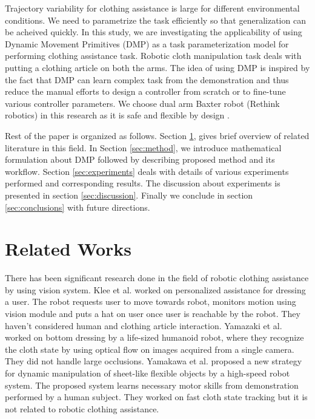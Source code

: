 \documentclass[sigconf]{acmart}
\begin{document}
Trajectory variability for clothing assistance is large for different environmental conditions. We need to parametrize the task efficiently so that generalization can be acheived quickly. In this study, we are investigating the applicability of using Dynamic Movement Primitives (DMP) as a task parameterization model for performing clothing assistance task. Robotic cloth manipulation task deals with putting a clothing article on both the arms. The idea of using DMP is inspired by the fact that DMP can learn complex task from the demonstration \cite{ijspeert2003learning, schaal2006dynamic, ijspeert2013dynamical} and thus reduce the manual efforts to design a controller from scratch or to fine-tune various controller parameters. We choose dual arm Baxter robot (Rethink robotics) in this research as it is safe and flexible by design \cite{fitzgerald2013developing}. 

Rest of the paper is organized as follows. Section \ref{sec:related_works}, gives brief overview of related literature in this field. In Section \ref{sec:method}, we introduce mathematical formulation about DMP followed by describing proposed method and its workflow. Section \ref{sec:experiments} deals with details of various experiments performed and corresponding results. The discussion about experiments is presented in section \ref{sec:discussion}. Finally we conclude in section \ref{sec:conclusions} with future directions.

\section{Related Works}
\label{sec:related_works}
There has been significant research done in the field of robotic clothing assistance by using vision system. Klee et al. \cite{klee2015personalized} worked on personalized assistance for dressing a user. The robot requests user to move towards robot, monitors motion using vision module and puts a hat on user once user is reachable by the robot. They haven't considered human and clothing article interaction. Yamazaki et al. \cite{yamazaki2013method, yamazaki2014bottom}  worked on bottom dressing by a life-sized humanoid robot, where they recognize the cloth state by using optical flow on images acquired from a single camera. They did not handle large occlusions. Yamakawa et al. \cite{yamakawa2011dynamic} proposed a new strategy for dynamic manipulation of sheet-like flexible objects by a high-speed robot system. The proposed system learns necessary motor skills from demonstration performed by a human subject. They worked on fast cloth state tracking but it is not related to robotic clothing assistance.
\end{document}
